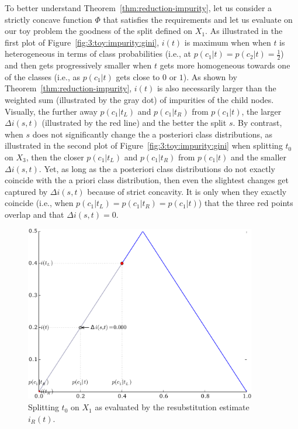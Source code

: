 To better understand Theorem~\ref{thm:reduction-impurity}, let us consider a
strictly concave function $\Phi$ that satisfies the requirements and let us
evaluate on our toy problem the goodness of the split defined on $X_1$.  As
illustrated in the first plot of Figure~\ref{fig:3:toy:impurity:gini},  $i(t)$
is maximum when when $t$ is heterogeneous in terms of class probabilities
(i.e., at $p(c_1|t)=p(c_2|t)=\tfrac{1}{2}$) and then gets progressively smaller
when $t$ gets more homogeneous towards one of the classes (i.e., as $p(c_1|t)$
gets close to $0$ or $1$). As shown by Theorem~\ref{thm:reduction-impurity},
$i(t)$ is also necessarily larger than the weighted sum (illustrated by the gray
dot) of impurities of the child nodes. Visually, the further away $p(c_1|t_L)$
and $p(c_1|t_R)$ from $p(c_1|t)$, the larger $\Delta i(s,t)$ (illustrated by
the red line) and the better the split $s$. By contrast, when $s$ does not
significantly change the a posteriori class distributions, as illustrated in
the second plot of Figure~\ref{fig:3:toy:impurity:gini} when splitting $t_0$ on
$X_3$, then the closer $p(c_1|t_L)$ and $p(c_1|t_R)$ from $p(c_1|t)$ and the
smaller $\Delta i(s,t)$. Yet, as long as the a posteriori class distributions
do not exactly coincide with the a priori class distribution, then even the
slightest changes get captured by $\Delta i(s, t)$ because of strict concavity.
It is only when they exactly coincide (i.e., when
$p(c_1|t_L)=p(c_1|t_R)=p(c_1|t)$) that the three red points overlap and that
$\Delta i(s,t)=0$.

\begin{figure}
\centering
\includegraphics[width=0.9\textwidth]{figures/ch3_toy_x1_error.pdf}
\caption{Splitting $t_0$ on $X_1$ as evaluated by the resubstitution estimate $i_R(t)$.}
\label{fig:3:toy:impurity:error}
\end{figure}

